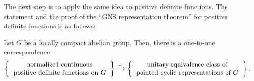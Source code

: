 \documentclass[a4paper]{article}
\begin{document}
The next step is to apply the same idea to positive definite functions.
The statement and the proof of the ``GNS representation theorem'' for positive definite functions is as follows:

\begin{thm}
Let $G$ be a locally compact abelian group.
Then, there is a one-to-one correspondence
\[\left\{\begin{tabular}{c}normalized continuous\\positive definite functions on $G$\end{tabular}\right\}\xrightarrow{\sim}\left\{\begin{tabular}{c}unitary equivalence class of\\pointed cyclic representations of $G$\end{tabular}\right\}.\]
\end{thm}
\end{document}
